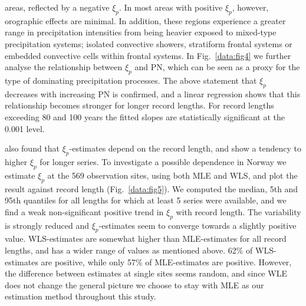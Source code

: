 \documentclass[12pt,a4paper,english]{article}
\begin{document}
areas, reflected by a negative $\xi_{p}$. In most areas with positive $\xi_{p}$, however, orographic effects are minimal. In addition, these regions experience a greater range in precipitation intensities from being heavier exposed to mixed-type precipitation systems; isolated convective showers, stratiform frontal systems or embedded convective cells within frontal systems.
In Fig.~\ref{data:fig4} we further analyse the relationship between $\xi_{p}$ and PN, which can be seen as a proxy for the type of dominating precipitation processes. The above statement that $\xi_{p}$ decreases with increasing PN is confirmed, and a linear regression shows that this relationship becomes stronger for longer record lengths. For record lengths exceeding 80 and 100 years the fitted slopes are statistically significant at the 0.001 level.  

\cite{PapalexiouandKoutsoyiannis2012} also found that $\xi_{p}$-estimates depend on the record length, and show a tendency to higher $\xi_{p}$ for longer series. To investigate a possible dependence in Norway we estimate $\xi_{p}$ at the 569 observation sites, using both MLE and WLS, and plot the result against record length (Fig.~\ref{data:fig5}). We computed the median, 5th and 95th quantiles for all lengths for which at least 5 series were available, and we find a weak non-significant positive trend in $\xi_{p}$ with record length. The variability is strongly reduced and $\xi_{p}$-estimates seem to converge towards a slightly positive value. WLS-estimates are somewhat higher than MLE-estimates for all record lengths, and has a wider range of values as mentioned above. 62\% of WLS-estimates are positive, while only 57\% of MLE-estimates are positive. However, the difference between estimates at single sites seems random, and since WLE does not change the general picture we choose to stay with MLE as our estimation method throughout this study. 


\end{document}
